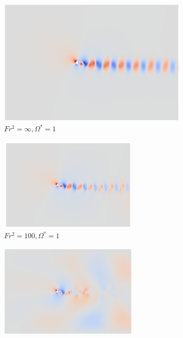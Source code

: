 \begin{figure}
    \begin{subfigure}[b]{0.32\textwidth}
        \centering
        \includegraphics[width=\textwidth]{images/circle/av1fsinf.png}
        \caption{$Fr^2 = \infty, \Omega^{\ast} = 1$}
        \label{fig:av1fsinf}
    \end{subfigure}
    \hfill
    \begin{subfigure}[b]{0.32\textwidth}
        \centering
        \includegraphics[width=\textwidth]{images/circle/av1fr10.png}
        \caption{$Fr^2 = 100, \Omega^{\ast} = 1$}
        \label{av1frs100}
    \end{subfigure}
    \hfill
    \begin{subfigure}[b]{0.32\textwidth}
        \centering
        \includegraphics[width=\textwidth]{images/circle/av1fr3.png}

\end{subfigure}
\end{figure}
